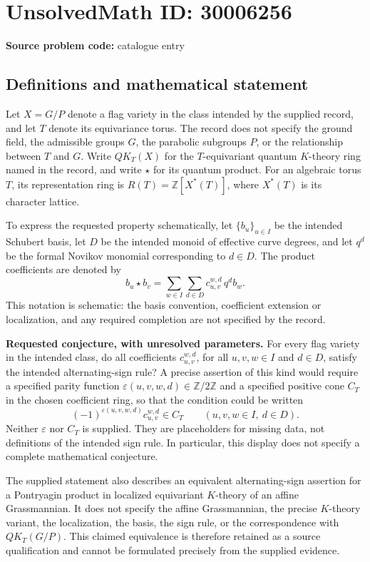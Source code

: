 \documentclass[11pt]{article}
\newcommand{\Z}{\mathbb{Z}}
\begin{document}
\section*{UnsolvedMath ID: 30006256}
\textbf{Source problem code:} catalogue entry
\subsection{Definitions and mathematical statement}
Let \(X=G/P\) denote a flag variety in the class intended by the supplied record, and let \(T\) denote its equivariance torus. The record does not specify the ground field, the admissible groups \(G\), the parabolic subgroups \(P\), or the relationship between \(T\) and \(G\). Write \(QK_T(X)\) for the \(T\)-equivariant quantum \(K\)-theory ring named in the record, and write \(\star\) for its quantum product. For an algebraic torus \(T\), its representation ring is \(R(T)=\Z[X^*(T)]\), where \(X^*(T)\) is its character lattice.

To express the requested property schematically, let \(\{b_u\}_{u\in I}\) be the intended Schubert basis, let \(D\) be the intended monoid of effective curve degrees, and let \(q^d\) be the formal Novikov monomial corresponding to \(d\in D\). The product coefficients are denoted by
\[
 b_u\star b_v=\sum_{w\in I}\sum_{d\in D}c_{u,v}^{w,d}\,q^d b_w.
\]
This notation is schematic: the basis convention, coefficient extension or localization, and any required completion are not specified by the record.

\textbf{Requested conjecture, with unresolved parameters.} For every flag variety in the intended class, do all coefficients \(c_{u,v}^{w,d}\), for all \(u,v,w\in I\) and \(d\in D\), satisfy the intended alternating-sign rule? A precise assertion of this kind would require a specified parity function \(\varepsilon(u,v,w,d)\in\Z/2\Z\) and a specified positive cone \(C_T\) in the chosen coefficient ring, so that the condition could be written
\[
 (-1)^{\varepsilon(u,v,w,d)}c_{u,v}^{w,d}\in C_T
 \qquad(u,v,w\in I,\ d\in D).
\]
Neither \(\varepsilon\) nor \(C_T\) is supplied. They are placeholders for missing data, not definitions of the intended sign rule. In particular, this display does not specify a complete mathematical conjecture.

The supplied statement also describes an equivalent alternating-sign assertion for a Pontryagin product in localized equivariant \(K\)-theory of an affine Grassmannian. It does not specify the affine Grassmannian, the precise \(K\)-theory variant, the localization, the basis, the sign rule, or the correspondence with \(QK_T(G/P)\). This claimed equivalence is therefore retained as a source qualification and cannot be formulated precisely from the supplied evidence.
\end{document}
